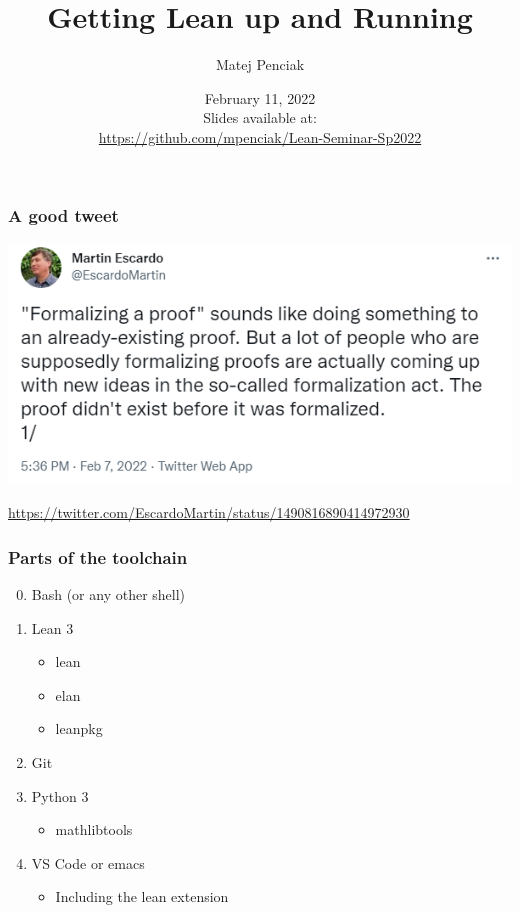 \documentclass{beamer}
\title{Getting Lean up and Running}
\author{Matej Penciak}
\institute{Northeastern University}
\date{February 11, 2022 \\ Slides available at: \\ \url{https://github.com/mpenciak/Lean-Seminar-Sp2022}}
\begin{document}
\frame{\titlepage}

\begin{frame}
    \frametitle{A good tweet}
    \begin{center}
        \includegraphics[scale=.6]{img/martin_tweet.png}
    \end{center}
    \url{https://twitter.com/EscardoMartin/status/1490816890414972930}

\end{frame}

\begin{frame}
    \frametitle{Parts of the toolchain}
    \begin{enumerate}
        \setcounter{enumi}{-1}
        \item Bash (or any other shell)
        \item Lean 3
        \begin{itemize}
            \item lean
            \item elan
            \item leanpkg
        \end{itemize}
        \item Git
        \item Python 3
        \begin{itemize}
            \item mathlibtools
        \end{itemize}
        \item VS Code or emacs
        \begin{itemize}
            \item Including the lean extension
        \end{itemize}
    \end{enumerate}
\end{frame}
\end{document}
